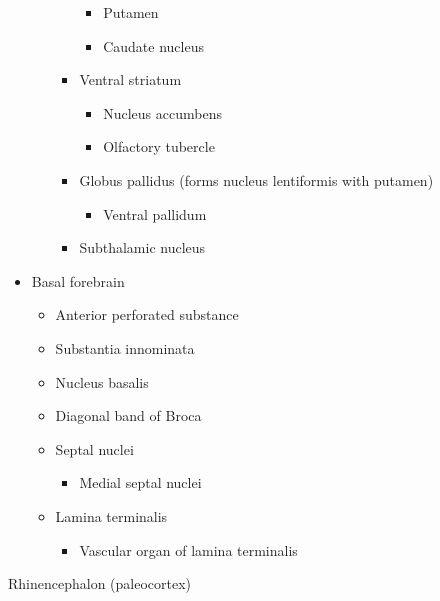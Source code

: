 \begin{itemize}
\begin{itemize}
\begin{itemize}
      \begin{itemize}
      \tightlist
      \item
        Putamen
      \item
        Caudate nucleus
      \end{itemize}
    \item
      Ventral striatum

      \begin{itemize}
      \tightlist
      \item
        Nucleus accumbens
      \item
        Olfactory tubercle
      \end{itemize}
    \item
      Globus pallidus (forms nucleus lentiformis with putamen)

      \begin{itemize}
      \tightlist
      \item
        Ventral pallidum
      \end{itemize}
    \item
      Subthalamic nucleus
    \end{itemize}
  \end{itemize}
\item
  Basal forebrain

  \begin{itemize}
  \tightlist
  \item
    Anterior perforated substance
  \item
    Substantia innominata
  \item
    Nucleus basalis
  \item
    Diagonal band of Broca
  \item
    Septal nuclei

    \begin{itemize}
    \tightlist
    \item
      Medial septal nuclei
    \end{itemize}
  \item
    Lamina terminalis

    \begin{itemize}
    \tightlist
    \item
      Vascular organ of lamina terminalis
    \end{itemize}
  \end{itemize}
\end{itemize}

Rhinencephalon (paleocortex)

